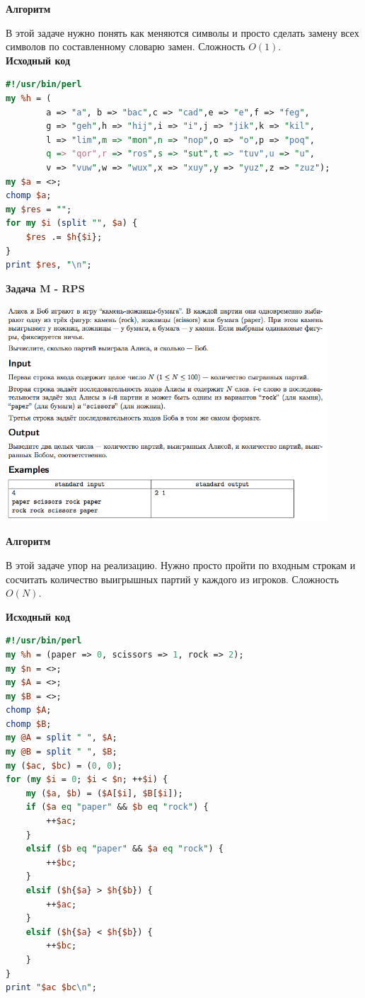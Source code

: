 \documentclass[a4paper,12pt]{article}
\begin{document}
\textbf{{\large Алгоритм}}

В этой задаче нужно понять как меняются символы и просто сделать замену всех символов по составленному словарю замен. Сложность $O(1)$. \\

\textbf{{\large Исходный код}} \\
\begin{lstlisting}[language=Perl]
#!/usr/bin/perl
my %h = (
		a => "a", b => "bac",c => "cad",e => "e",f => "feg",
		g => "geh",h => "hij",i => "i",j => "jik",k => "kil",
		l => "lim",m => "mon",n => "nop",o => "o",p => "poq",
		q => "qor",r => "ros",s => "sut",t => "tuv",u => "u",
		v => "vuw",w => "wux",x => "xuy",y => "yuz",z => "zuz");
my $a = <>;
chomp $a;
my $res = "";
for my $i (split "", $a) {
	$res .= $h{$i};
}
print $res, "\n";
\end{lstlisting}


\newpage
\textbf{{\large Задача M - RPS}} \\

\begin{center}
\includegraphics[width=0.9\textwidth]{OC_Japan/M.png}\\ [1cm]
\end{center}

\textbf{{\large Алгоритм}}

В этой задаче упор на реализацию. Нужно просто пройти по входным строкам и сосчитать количество выигрышных партий у каждого из игроков. Сложность $O(N)$.

\newpage
\textbf{{\large Исходный код}} \\
\begin{lstlisting}[language=Perl]
#!/usr/bin/perl
my %h = (paper => 0, scissors => 1, rock => 2);
my $n = <>;
my $A = <>;
my $B = <>;
chomp $A;
chomp $B;
my @A = split " ", $A;
my @B = split " ", $B;
my ($ac, $bc) = (0, 0);
for (my $i = 0; $i < $n; ++$i) {
	my ($a, $b) = ($A[$i], $B[$i]);
	if ($a eq "paper" && $b eq "rock") {
		++$ac;
	}
	elsif ($b eq "paper" && $a eq "rock") {
		++$bc;
	}
	elsif ($h{$a} > $h{$b}) {
		++$ac;
	}
	elsif ($h{$a} < $h{$b}) {
		++$bc;
	}
}
print "$ac $bc\n";
\end{lstlisting}
\end{document}
